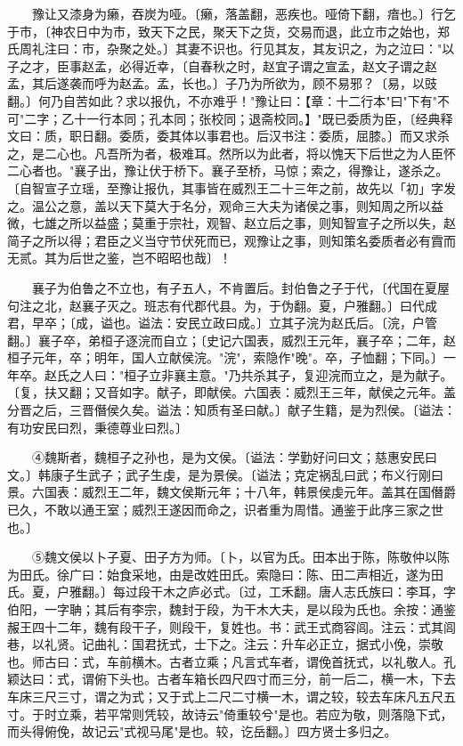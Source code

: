 　　豫让又漆身为癞，吞炭为哑。〔癞，落盖翻，恶疾也。哑倚下翻，瘖也。〕行乞于市，〔神农日中为市，致天下之民，聚天下之货，交易而退，此立市之始也，郑氏周礼注曰：市，杂聚之处。〕其妻不识也。行见其友，其友识之，为之泣曰："以子之才，臣事赵孟，必得近幸，〔自春秋之时，赵宜子谓之宣孟，赵文子谓之赵孟，其后遂袭而呼为赵孟。孟，长也。〕子乃为所欲为，顾不易邪？〔易，以豉翻。〕何乃自苦如此？求以报仇，不亦难乎！"豫让曰：【章：十二行本"曰"下有"不可"二字；乙十一行本同；孔本同；张校同；退斋校同。】"既已委质为臣，〔经典释文曰：质，职日翻。委质，委其体以事君也。后汉书注：委质，屈膝。〕而又求杀之，是二心也。凡吾所为者，极难耳。然所以为此者，将以愧天下后世之为人臣怀二心者也。"襄子出，豫让伏于桥下。襄子至桥，马惊；索之，得豫让，遂杀之。〔自智宣子立瑶，至豫让报仇，其事皆在威烈王二十三年之前，故先以「初」字发之。温公之意，盖以天下莫大于名分，观命三大夫为诸侯之事，则知周之所以益微，七雄之所以益盛；莫重于宗社，观智、赵立后之事，则知智宣子之所以失，赵简子之所以得；君臣之义当守节伏死而已，观豫让之事，则知策名委质者必有霣而无贰。其为后世之鉴，岂不昭昭也哉〕！

　　襄子为伯鲁之不立也，有子五人，不肯置后。封伯鲁之子于代，〔代国在夏屋句注之北，赵襄子灭之。班志有代郡代县。为，于伪翻。夏，户雅翻。〕曰代成君，早卒；〔成，谥也。谥法：安民立政曰成。〕立其子浣为赵氏后。〔浣，户管翻。〕襄子卒，弟桓子逐浣而自立；〔史记六国表，威烈王元年，襄子卒；二年，赵桓子元年，卒；明年，国人立献侯浣。"浣"，索隐作"晚"。卒，子恤翻；下同。〕一年卒。赵氏之人曰："桓子立非襄主意。"乃共杀其子，复迎浣而立之，是为献子。〔复，扶又翻；又音如字。献子，即献侯。六国表：威烈王三年，献侯之元年。盖分晋之后，三晋僭侯久矣。谥法：知质有圣曰献。〕献子生籍，是为烈侯。〔谥法：有功安民曰烈，秉德尊业曰烈。〕

　　④魏斯者，魏桓子之孙也，是为文侯。〔谥法：学勤好问曰文；慈惠安民曰文。〕韩康子生武子；武子生虔，是为景侯。〔谥法；克定祸乱曰武；布义行刚曰景。六国表：威烈王二年，魏文侯斯元年；十八年，韩景侯虔元年。盖其在国僭爵已久，不敢以通王室；威烈王遂因而命之，识者重为周惜。通鉴于此序三家之世也。〕

　　⑤魏文侯以卜子夏、田子方为师。〔卜，以官为氏。田本出于陈，陈敬仲以陈为田氏。徐广曰：始食采地，由是改姓田氏。索隐曰：陈、田二声相近，遂为田氏。夏，户雅翻。〕每过段干木之庐必式。〔过，工禾翻。唐人志氏族曰：李耳，字伯阳，一字聃；其后有李宗，魏封于段，为干木大夫，是以段为氏也。余按：通鉴赧王四十二年，魏有段干子，则段干，复姓也。书：武王式商容闾。注云：式其闾巷，以礼贤。记曲礼：国君抚式，士下之。注云：升车必正立，据式小俛，崇敬也。师古曰：式，车前横木。古者立乘；凡言式车者，谓俛首抚式，以礼敬人。孔颖达曰：式，谓俯下头也。古者车箱长四尺四寸而三分，前一后二，横一木，下去车床三尺三寸，谓之为式；又于式上二尺二寸横一木，谓之较，较去车床凡五尺五寸。于时立乘，若平常则凭较，故诗云"倚重较兮"是也。若应为敬，则落隐下式，而头得俯俛，故记云"式视马尾"是也。较，讫岳翻。〕四方贤士多归之。

